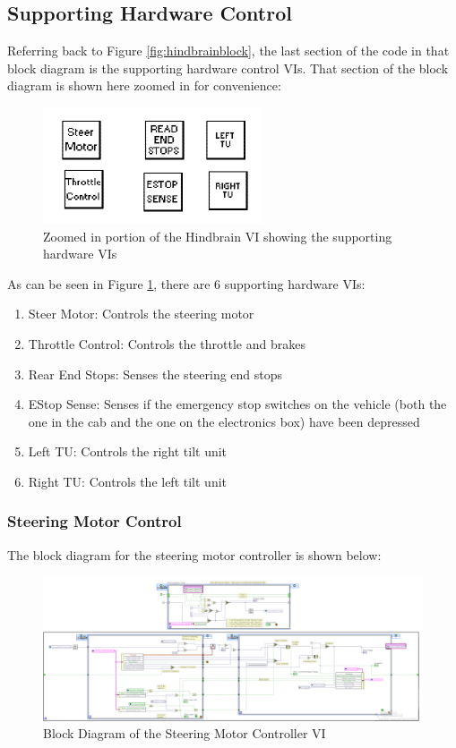 \subsection{Supporting Hardware Control}

Referring back to Figure \ref{fig:hindbrainblock}, the last section of the code in that block diagram is the supporting hardware control VIs. That section of the block diagram is shown here zoomed in for convenience:

\begin{figure}[h!]
\centering
\includegraphics[scale=2.0]{Photos/supportinghardwarevis.png}
\caption{Zoomed in portion of the Hindbrain VI showing the supporting hardware VIs}
\label{fig:supportinghardwarevis}
\end{figure}

\noindent As can be seen in Figure \ref{fig:supportinghardwarevis}, there are 6 supporting hardware VIs:

\begin{enumerate}
\item Steer Motor: Controls the steering motor
\item Throttle Control: Controls the throttle and brakes
\item Rear End Stops: Senses the steering end stops
\item EStop Sense: Senses if the emergency stop switches on the vehicle (both the one in the cab and the one on the electronics box) have been depressed
\item Left TU: Controls the right tilt unit
\item Right TU: Controls the left tilt unit
\end{enumerate}

\newpage

\subsubsection{Steering Motor Control}

The block diagram for the steering motor controller is shown below:
\begin{figure}[h!]
\centering
\includegraphics[scale=0.3]{Photos/steermotorblock.png}
\caption{Block Diagram of the Steering Motor Controller VI}
\label{fig:steermotorblock}
\end{figure}

